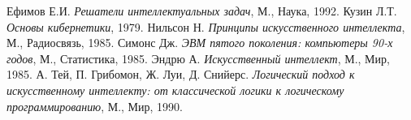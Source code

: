 \begin{thebibliography}{9}
Ефимов Е.И. \textsl{Решатели интеллектуальных задач},
М., Наука, 1992.
Кузин Л.Т. \textsl{Основы кибернетики},
1979.
Нильсон Н. \textsl{Принципы искусственного интеллекта},
М., Радиосвязь, 1985.
Симонс Дж. \textsl{ЭВМ пятого поколения: компьютеры 90-х годов},
М., Статистика, 1985.
Эндрю А. \textsl{Искусственный интеллект},
М., Мир, 1985.
\bibitem{}
А. Тей, П. Грибомон, Ж. Луи, Д. Снийерс. \textsl{Логический подход к искусственному интеллекту: от классической логики к логическому программированию},
М., Мир, 1990.
\end{thebibliography}
